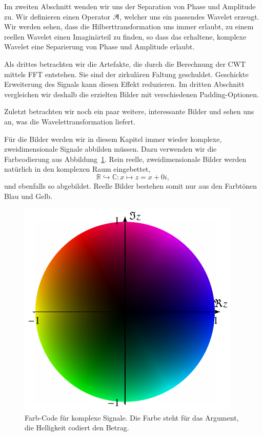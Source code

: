 \begin{refsection}
Im zweiten Abschnitt wenden wir uns der Separation von Phase und Amplitude zu.
Wir definieren einen Operator $\Ana\,$, welcher uns ein passendes Wavelet erzeugt.
Wir werden sehen, dass die Hilberttransformation uns immer erlaubt, zu einem reellen Wavelet einen Imaginärteil zu finden,
so dass das erhaltene, komplexe Wavelet eine Separierung von Phase und Amplitude erlaubt.

Als drittes betrachten wir die Artefakte, die durch die Berechnung der CWT mittels FFT entstehen.
Sie sind der zirkulären Faltung geschuldet.
Geschickte Erweiterung des Signals kann diesen Effekt reduzieren.
Im dritten Abschnitt vergleichen wir deshalb die erzielten Bilder mit verschiedenen Padding-Optionen.

Zuletzt betrachten wir noch ein paar weitere, interessante Bilder und sehen uns an, was die Wavelettransformation liefert.

Für die Bilder werden wir in diesem Kapitel immer wieder komplexe, zweidimensionale Signale abbilden müssen.
Dazu verwenden wir die Farbcodierung aus Abbildung~\ref{complex:color-code}.
Rein reelle, zweidimensionale Bilder werden natürlich in den komplexen Raum eingebettet, 
\[ \mathbb R \hookrightarrow \mathbb C \colon x \mapsto z = x + 0i,\]
und ebenfalls so abgebildet.
Reelle Bilder bestehen somit nur aus den Farbtönen Blau und Gelb.

\begin{figure}
	\centering
	\includegraphics{papers/complex/images/colors.pdf}
	\caption{Farb-Code für komplexe Signale. Die Farbe steht für das Argument, die Helligkeit codiert den Betrag.}
	\label{complex:color-code}
\end{figure}












\printbibliography[heading=subbibliography]
\end{refsection}
